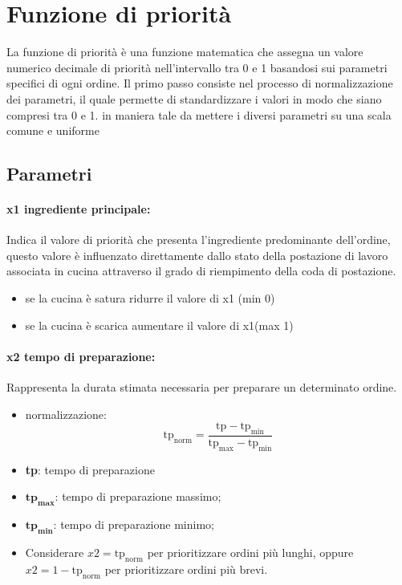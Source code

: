 \section{Funzione di priorità}
La funzione di priorità è una funzione matematica che assegna un valore numerico decimale di priorità nell’intervallo tra 0 e 1 basandosi sui parametri specifici di ogni ordine.
Il primo passo consiste nel processo di normalizzazione dei parametri, il quale permette di standardizzare i valori in modo che siano compresi tra 0 e 1. in maniera tale da mettere i diversi parametri su una scala comune e uniforme

\subsection{Parametri}

\paragraph{x1 ingrediente principale:}
Indica il valore di priorità che presenta l'ingrediente predominante dell’ordine, questo valore è influenzato direttamente dallo stato della postazione di lavoro associata in cucina attraverso il grado di riempimento della coda di postazione.
\begin{itemize}
	\item se la cucina è satura ridurre il valore di x1 (min 0)
	\item se la cucina è scarica aumentare il valore di x1(max 1)
\end{itemize}


\paragraph{x2 tempo di preparazione:}
Rappresenta la durata stimata necessaria per preparare un determinato ordine.
\begin{itemize}
	\item normalizzazione: 
	\begin{equation*}
		\text{tp}_{\text{norm}} = \frac{\text{tp} - \text{tp}_{\text{min}}}{\text{tp}_{\text{max}} - \text{tp}_{\text{min}}}	
	\end{equation*}
	
	\item \textbf{tp}: tempo di preparazione
	\item $\textbf{tp}_{\textbf{max}}$: tempo di preparazione massimo;
	\item $\textbf{tp}_{\textbf{min}}$: tempo di preparazione minimo;
	\item Considerare $x2 = \text{tp}_{\text{norm}}$ per prioritizzare ordini più lunghi, oppure $x2 = 1-\text{tp}_{\text{norm}}$ per prioritizzare ordini più brevi.
\end{itemize}



